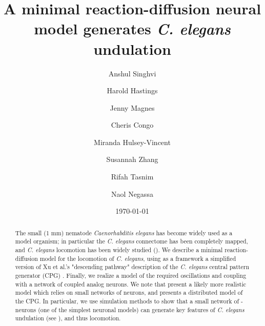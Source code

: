 \documentclass[
    11pt,
]{article}
\begin{document}


\title{A minimal reaction-diffusion neural model generates {\emph{C. elegans}} undulation}

\author[1]{Anshul Singhvi}

\author[1,3]{Harold Hastings}

\author[2]{Jenny Magnes}

\author[2]{Cheris Congo}

\author[2]{Miranda Hulsey-Vincent}

\author[2]{Susannah Zhang}

\author[1]{Rifah Tasnim}

\author[1]{Naol Negassa}


\date{\today}

\begin{abstract}

    The small (1 mm) nematode \emph{Caenorhabditis elegans} \cite{corsi2015} has become widely used as a model organism; in particular the \emph{C. elegans} connectome has been completely mapped, and \emph{C. elegans} locomotion has been widely studied (\citet{corsi2015}). We describe a minimal reaction-diffusion model for the locomotion of \emph{C. elegans}, using as a framework a simplified version of Xu et al.'s "descending pathway" description of the \emph{C. elegans} central pattern generator (CPG) \citet{xu2018,wen2012}.  Finally, we realize a model of the required oscillations and coupling with a network of coupled \citet{keener1983} analog neurons.
    We note that \citet{olivares2019} present a likely more realistic model which relies on small networks of neurons, and presents a distributed model of the CPG. In particular, we use simulation methods to show that a small network of \citet{fitzhugh1955}-\citet{nagumo1962} neurons (one of the simplest neuronal models) can generate key features of \emph{C. elegans} undulation (see \citet{magnes2012}), and thus locomotion.
\end{abstract}

\maketitle
\end{document}
